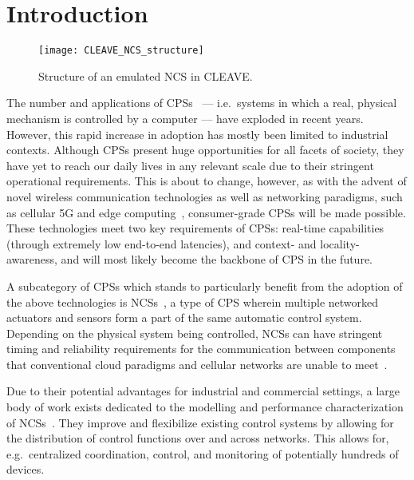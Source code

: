 \section{Introduction}\label{sec:intro}

\begin{figure*}
    \centering
    \texttt{[image: CLEAVE\_NCS\_structure]}
    \caption{
        Structure of an emulated \acl*{NCS} in \acs*{CLEAVE}.
    }\label{fig:cleave:ncs:struct}
\end{figure*}

The number and applications of \acp{CPS}~\cite{Rajkumar2010CPS} --- i.e.\ systems in which a real, physical mechanism is controlled by a computer --- have exploded in recent years.
However, this rapid increase in adoption has mostly been limited to industrial contexts.
Although \acp{CPS} present huge opportunities for all facets of society, they have yet to reach our daily lives in any relevant scale due to their stringent operational requirements.
This is about to change, however, as with the advent of novel wireless communication technologies as well as networking paradigms, such as cellular 5G and edge computing~\cite{Satya2017Emergence}, consumer-grade \acp{CPS} will be made possible.
These technologies meet two key requirements of \acp{CPS}: real-time capabilities (through extremely low end-to-end latencies), and context- and locality-awareness, and will most likely become the backbone of \ac{CPS} in the future.

A subcategory of \acp{CPS} which stands to particularly benefit from the adoption of the above technologies is \acp{NCS}~\cite{Gupta2010NCSOverview}, a type of \ac{CPS} wherein multiple networked actuators and sensors form a part of the same automatic control system.
Depending on the physical system being controlled, \acp{NCS} can have stringent timing and reliability requirements for the communication between components that conventional cloud paradigms and cellular networks are unable to meet~\cite{Wan2020Efficient}.

Due to their potential advantages for industrial and commercial settings, a large body of work exists dedicated to the modelling and performance characterization of \acp{NCS}~\cite{Zhang2013Survey,Zhang2016Survey}.
They improve and flexibilize existing control systems by allowing for the distribution of control functions over and across networks.
This allows for, e.g.\ centralized coordination, control, and monitoring of potentially hundreds of devices.

